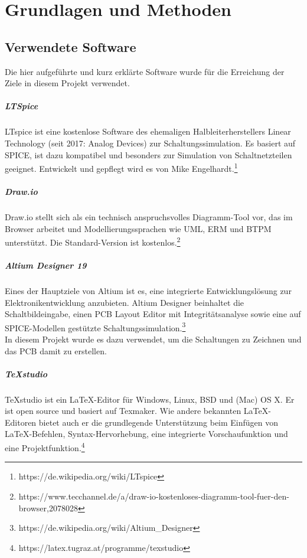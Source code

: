 \documentclass[paper=a4, 12pt]{scrreprt}
\begin{document}
\chapter{Grundlagen und Methoden}\hfill \break
	\section{Verwendete Software}\hfill \break
	Die hier aufgeführte und kurz erklärte Software wurde für die Erreichung der Ziele in diesem Projekt verwendet.
	
	\paragraph{LTSpice}\hfill \break
	LTspice ist eine kostenlose Software des ehemaligen Halbleiterherstellers Linear Technology (seit 2017: Analog Devices) zur Schaltungssimulation. Es basiert auf SPICE, ist dazu kompatibel und besonders zur Simulation von Schaltnetzteilen geeignet. Entwickelt und gepflegt wird es von Mike Engelhardt.\footnote{https://de.wikipedia.org/wiki/LTspice}
	\paragraph{Draw.io}\hfill \break
	Draw.io stellt sich als ein technisch anspruchsvolles Diagramm-Tool vor, das im Browser arbeitet und Modellierungssprachen wie UML, ERM und BTPM unterstützt. Die Standard-Version ist kostenlos.\footnote{https://www.tecchannel.de/a/draw-io-kostenloses-diagramm-tool-fuer-den-browser,2078028}
	\paragraph{Altium Designer 19}\hfill \break
	Eines der Hauptziele von Altium ist es, eine integrierte Entwicklungslösung zur Elektronikentwicklung anzubieten.
	Altium Designer beinhaltet die Schaltbildeingabe, einen PCB Layout Editor mit Integritätsanalyse sowie eine auf SPICE-Modellen gestützte Schaltungssimulation.\footnote{https://de.wikipedia.org/wiki/Altium\_Designer}\\
	In diesem Projekt wurde es dazu verwendet, um die Schaltungen zu Zeichnen und das PCB damit zu erstellen.
	\paragraph{TeXstudio}\hfill \break
	TeXstudio ist ein LaTeX-Editor für Windows, Linux, BSD und (Mac) OS X. Er ist open source und basiert auf Texmaker. Wie andere bekannten LaTeX-Editoren bietet auch er die grundlegende Unterstützung beim Einfügen von LaTeX-Befehlen, Syntax-Hervorhebung, eine integrierte Vorschaufunktion und eine Projektfunktion.\footnote{https://latex.tugraz.at/programme/texstudio}
\end{document}
